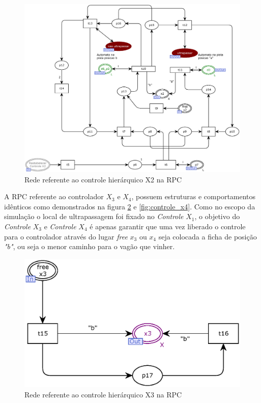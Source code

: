 \begin{figure}[ht]
    \centering
    \caption{Rede referente ao controle hierárquico X2 na RPC}
    \label{fig:controle_x2}
    \includegraphics[width=1\linewidth]{figures//Simulation//Modelagem/controle_x2.eps}
\end{figure}

A RPC referente ao controlador $X_3$ e $X_4$, possuem estruturas e comportamentos idênticos como demonstrados na figura \ref{fig:controle_x3} e \ref{fig:controle_x4}. Como no escopo da simulação o local de ultrapassagem foi fixado no \textit{Controle} $X_1$, o objetivo do \textit{Controle} $X_3$ e \textit{Controle} $X_4$ é apenas garantir que uma vez liberado o controle para o controlador através do lugar \textit{free} $x_3$ ou $x_4$ seja colocada a ficha de posição \textit{"b"}, ou seja o menor caminho para o vagão que vinher.

\begin{figure}[ht]
    \centering
    \caption{Rede referente ao controle hierárquico X3 na RPC}
    \label{fig:controle_x3}
    \includegraphics[width=0.6\linewidth]{figures//Simulation//Modelagem/controle_x3.eps}
\end{figure}

